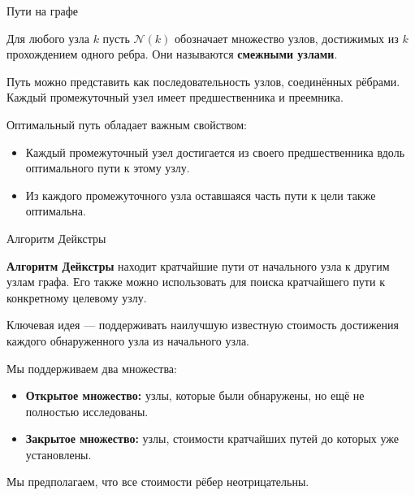 \documentclass{beamer}
\begin{document}
	\begin{frame}{Пути на графе}
		\begin{flushleft}
			
			Для любого узла $k$ пусть $\mathcal{N}(k)$ обозначает
			множество узлов, достижимых из $k$
			прохождением одного ребра. Они называются
			\textbf{смежными узлами}.
			
			\medskip
			
			Путь можно представить как последовательность узлов,
			соединённых рёбрами. Каждый промежуточный узел имеет
			предшественника и преемника.
			
			
			\medskip
			
			
			Оптимальный путь обладает важным свойством:
			
			\begin{itemize}
				\item Каждый промежуточный узел достигается из
				своего предшественника вдоль оптимального пути к этому
				узлу.
				\item Из каждого промежуточного узла оставшаяся
				часть пути к цели также оптимальна.
			\end{itemize}
			
			
		\end{flushleft}
	\end{frame}
	
	\begin{frame}{Алгоритм Дейкстры}
		\begin{flushleft}
			
			\textbf{Алгоритм Дейкстры} находит кратчайшие пути
			от начального узла к другим узлам графа.
			Его также можно использовать для поиска кратчайшего пути к
			конкретному целевому узлу.
			
			
			\medskip
			Ключевая идея — поддерживать наилучшую известную
			стоимость достижения каждого обнаруженного узла из
			начального узла.
			
			\medskip
			
			Мы поддерживаем два множества:
			
			\begin{itemize}
				\item \textbf{Открытое множество:} узлы, которые были
				обнаружены, но ещё не полностью исследованы.
				\item \textbf{Закрытое множество:} узлы, стоимости кратчайших
				путей до которых уже установлены.
			\end{itemize}
			
			Мы предполагаем, что все стоимости рёбер неотрицательны.
			
		\end{flushleft}
	\end{frame}
	
\end{document}
